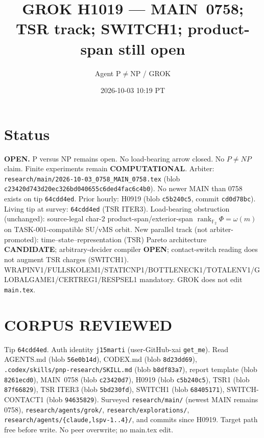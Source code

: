 \documentclass[11pt]{article}
\title{GROK H1019 --- MAIN~0758; TSR track; SWITCH1; product-span still open}
\author{Agent P$\neq$NP / GROK}
\date{2026-10-03 10:19 PT}
\begin{document}
\maketitle

\section*{Status}
\textbf{OPEN.} P versus NP remains open. No load-bearing arrow closed. No $P\neq NP$ claim.
Finite experiments remain \textbf{COMPUTATIONAL}.
Arbiter: \texttt{research/main/2026-10-03\_0758\_MAIN\_0758.tex}
(blob \texttt{c23420d743d20ec326bd040655c6ded4fac6c4b0}).
No newer MAIN than 0758 exists on tip \texttt{64cdd4ed}.
Prior hourly: H0919 (blob \texttt{c5b240c5}, commit \texttt{cd0d78bc}).
Living tip at survey: \texttt{64cdd4ed} (TSR ITER3).
Load-bearing obstruction (unchanged): source-legal char-$2$ product-span/exterior-span
$\operatorname{rank}_{\mathbb F_2}\Phi=\omega(m)$ on TASK-001-compatible SU/vMS orbit.
New parallel track (not arbiter-promoted): time--state--representation (TSR) Pareto
architecture \textbf{CANDIDATE}; arbitrary-decider compiler \textbf{OPEN};
contact-switch reading does not augment TSR charges (SWITCH1).
WRAPINV1/FULLSKOLEM1/STATICNP1/BOTTLENECK1/TOTALENV1/GLOBALGAME1/CERTREG1/RESPSEL1 mandatory.
GROK does not edit \texttt{main.tex}.

\section*{CORPUS REVIEWED}
Tip \texttt{64cdd4ed}. Auth identity \texttt{j15marti} (user-GitHub-xai \texttt{get\_me}).
Read AGENTS.md (blob \texttt{56e0b14d}), CODEX.md (blob \texttt{8d23dd69}),
\texttt{.codex/skills/pnp-research/SKILL.md} (blob \texttt{b8df83a7}),
report template (blob \texttt{8261ecd0}),
MAIN~0758 (blob \texttt{c23420d7}),
H0919 (blob \texttt{c5b240c5}),
TSR1 (blob \texttt{87f66829}),
TSR ITER3 (blob \texttt{5bd230fd}),
SWITCH1 (blob \texttt{68405171}),
SWITCH-CONTACT1 (blob \texttt{94635829}).
Surveyed \texttt{research/main/} (newest MAIN remains 0758),
\texttt{research/agents/grok/}, \texttt{research/explorations/},
\texttt{research/agents/\{claude,lspv-1..4\}/}, and commits since H0919.
Target path free before write. No peer overwrite; no main.tex edit.
\end{document}
